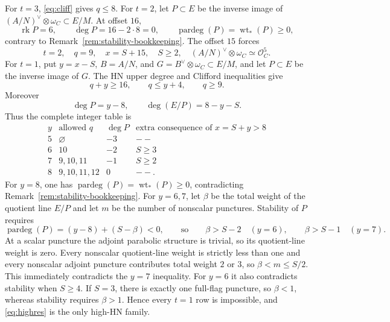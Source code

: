 \documentclass[11pt]{article}
\theoremstyle{definition}
\newcommand{\Ocal}{\mathcal O}
\newcommand{\rk}{\operatorname{rk}}
\newcommand{\degp}{\operatorname{pardeg}}
\begin{document}
For $t=3$, \eqref{eq:cliff} gives $q\le8$.  For $t=2$, let $P\subset E$
be the inverse image of $(A/N)^\vee\otimes\omega_C\subset E/M$.  At offset
$16$,
\[
 \rk P=6,\qquad \deg P=16-2\cdot8=0,
 \qquad \degp(P)=\operatorname{wt}_*(P)\ge0,
\]
contrary to Remark~\ref{rem:stability-bookkeeping}.  The offset $15$
forces
\[
 t=2,\quad q=9,\quad x=S+15,\quad S\ge2,
 \quad(A/N)^\vee\otimes\omega_C\simeq\Ocal_C^5.
\label{eq:highres}\tag{7.4}
\]
For $t=1$, put $y=x-S$, $B=A/N$, and
$G=B^\vee\otimes\omega_C\subset E/M$, and let $P\subset E$ be the inverse
image of $G$.  The HN upper degree and Clifford inequalities give
\[
 q+y\ge16,
 \qquad q\le y+4,
 \qquad q\ge9.
\]
Moreover
\[
 \deg P=y-8,
 \qquad \deg(E/P)=8-y-S.
\]
Thus the complete integer table is
\[
\begin{array}{c|c|c|c}
y&\text{allowed }q&\deg P&\text{extra consequence of }x=S+y>8\\ \hline
5&\varnothing&-3&--\\
6&10&-2&S\ge3\\
7&9,10,11&-1&S\ge2\\
8&9,10,11,12&0&--.
\end{array}
\]
For $y=8$, one has
$\degp(P)=\operatorname{wt}_*(P)\ge0$, contradicting
Remark~\ref{rem:stability-bookkeeping}.  For $y=6,7$, let $\beta$ be the total
weight of the quotient line $E/P$ and let $m$ be the number of nonscalar
punctures.  Stability of $P$ requires
\[
 \degp(P)=(y-8)+(S-\beta)<0,
 \qquad\text{so}\qquad
 \beta>S-2\quad(y=6),
 \qquad
 \beta>S-1\quad(y=7).
\]
At a scalar puncture the adjoint parabolic structure is trivial, so its
quotient-line weight is zero.  Every nonscalar quotient-line weight is
strictly less than one and every nonscalar adjoint puncture contributes total
weight $2$ or $3$, so $\beta<m\le S/2$.  This immediately contradicts the
$y=7$ inequality.  For
$y=6$ it also contradicts stability when $S\ge4$.  If $S=3$, there is
exactly one full-flag puncture, so $\beta<1$, whereas stability requires
$\beta>1$.  Hence every $t=1$ row is impossible, and
\eqref{eq:highres} is the only high-HN family.
\end{document}
